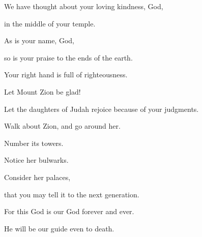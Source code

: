 {\Q {}We have thought about your loving kindness, God,
\par }{\QB in the middle of your temple.
\par }{\Q {}As is your name, God,
\par }{\QB so is your praise to the ends of the earth.
\par }{\QB Your right hand is full of righteousness.
\par }{\Q {}Let Mount Zion be glad!
\par }{\QB Let the daughters of Judah rejoice because of your judgments.
\par }{\Q {}Walk about Zion, and go around her.
\par }{\QB Number its towers.
\par }{\Q {}Notice her bulwarks.
\par }{\QB Consider her palaces,
\par }{\QB that you may tell it to the next generation.
\par }{\Q {}For this God is our God forever and ever.
\par }{\QB He will be our guide even to death.

}

